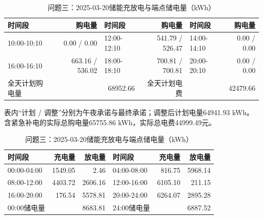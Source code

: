 \begin{table}[H]\centering\small\setlength{\tabcolsep}{5pt}
\caption{问题三：2025-03-20购电结果（电量：kWh；费用：元）}
\begin{tabular}{lrlrlr}\toprule
时间段 & 购电量 & 时间段 & 购电量 & 时间段 & 购电量 \\\midrule
10:00-10:10 & 0.00 / 0.00 & 12:00-12:10 & 541.79 / 526.47 & 14:00-14:10 & 0.00 / 0.00\\
16:00-16:10 & 663.16 / 536.02 & 18:00-18:10 & 700.81 / 700.81 & 20:00-20:10 & 0.00 / 0.00\\
\midrule 全天计划购电量 & \multicolumn{2}{r}{68952.66} & 全天计划电费 & \multicolumn{2}{r}{42479.66}\\\bottomrule
\end{tabular}
\par\vspace{2pt}\footnotesize
表内“计划 / 调整”分别为午夜承诺与最终承诺；调整后计划电量64941.93 kWh。
含紧急补电的实际总购电量65755.86 kWh，实际总电费44999.49元。
\vspace{3pt}\small
\caption{问题三：2025-03-20储能充放电与端点储电量（kWh）}
\begin{tabular}{lrrlrr}\toprule
时间段 & 充电量 & 放电量 & 时间段 & 充电量 & 放电量 \\\midrule
00:00-04:00 & 1549.05 & 2.46 & 04:00-08:00 & 816.75 & 5968.14\\
08:00-12:00 & 4403.72 & 2606.16 & 12:00-16:00 & 6105.10 & 211.15\\
16:00-20:00 & 176.54 & 5578.81 & 20:00-24:00 & 6264.07 & 2895.28\\
\midrule 00:00储电量 & \multicolumn{2}{r}{8683.81} & 24:00储电量 & \multicolumn{2}{r}{6887.52}\\\bottomrule
\end{tabular}\end{table}
